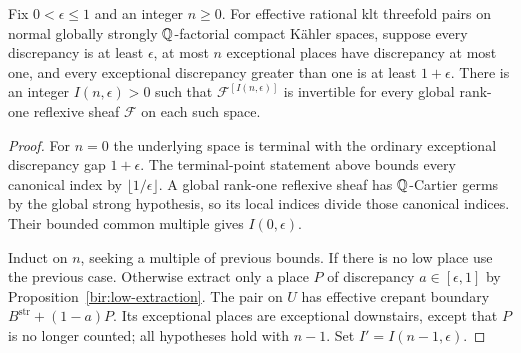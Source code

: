 \begin{proposition}
\label{bir:index}
Fix $0<\epsilon\leq1$ and an integer $n\geq0$.  For effective
rational klt threefold pairs on normal globally strongly
$\mathbb{Q}$-factorial compact K\"ahler spaces, suppose every discrepancy is
at least $\epsilon$, at most $n$ exceptional places have discrepancy
at most one, and every exceptional discrepancy greater than one is
at least $1+\epsilon$.  There is an integer $I(n,\epsilon)>0$ such
that $\mathcal F^{[I(n,\epsilon)]}$ is invertible for every global
rank-one reflexive sheaf $\mathcal F$ on each such space.
\end{proposition}

\begin{proof}
For $n=0$ the underlying space is terminal with the ordinary
exceptional discrepancy gap $1+\epsilon$.  The terminal-point
statement above bounds every canonical index by
$\lfloor1/\epsilon\rfloor$.  A global rank-one reflexive sheaf has
$\mathbb{Q}$-Cartier germs by the global strong hypothesis, so its local
indices divide those canonical indices.  Their bounded common
multiple gives $I(0,\epsilon)$.

Induct on $n$, seeking a multiple of previous bounds.  If there is no
low place use the previous case.  Otherwise extract only a place
$P$ of discrepancy $a\in[\epsilon,1]$ by
Proposition~\ref{bir:low-extraction}.  The pair on $U$ has effective
crepant boundary $B^{\mathrm{str}}+(1-a)P$.  Its exceptional places
are exceptional downstairs, except that $P$ is no longer counted;
all hypotheses hold with $n-1$.  Set $I'=I(n-1,\epsilon)$.


\end{proof}
